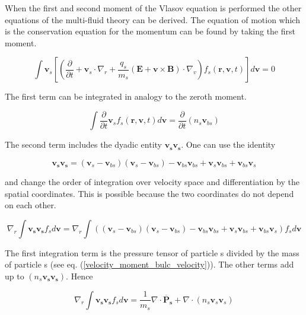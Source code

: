 \documentclass[a4paper,11pt]{thesis}
\begin{document}
When the first and second moment of the Vlasov equation is performed
the other equations of the multi-fluid theory can be derived. The equation of motion which is the
conservation equation for the momentum can be found by taking the
first moment.

\begin{equation}
\int \mathbf{v}_s \left[ \left( \frac{\partial}{\partial t} + \mathbf{v}_s \cdot
\nabla_r+\frac{q_s}{m_s}(\mathbf{E}+\mathbf{v}\times
\mathbf{B})\cdot\nabla_v \right) f_s(\mathbf{r,v},t)\right]
d\mathbf{v} =0
\end{equation}

The first term can be integrated in analogy to the zeroth moment.

\begin{equation}
 \int \frac{\partial}{\partial t}\mathbf{v}_s f_s(\mathbf{r,v},t)
d\mathbf{v} = \frac{\partial}{\partial t}( n_s\mathbf{v}_{bs})
\end{equation}

The second term includes the dyadic entity $\mathbf{v_sv_s}$. One can use the identity

\begin{equation}
 \mathbf{v_sv_s}=(\mathbf{v}_s-\mathbf{v}_{bs})(\mathbf{v}_s-\mathbf{v}_{bs})-\mathbf{v}_{bs}\mathbf{v}_{bs}+\mathbf{v}_{s}\mathbf{v}_{bs}+\mathbf{v}_{bs}\mathbf{v}_{s}
\end{equation}

and change the order of integration over velocity space and differentiation by the spatial coordinates. This is possible because the two coordinates do not depend on each other.

\begin{equation}
 \nabla_r \int  \mathbf{v_sv_s} f_s d\mathbf{v}= \nabla_r \int  ((\mathbf{v}_s-\mathbf{v}_{bs})(\mathbf{v}_s-\mathbf{v}_{bs})-\mathbf{v}_{bs}\mathbf{v}_{bs}+\mathbf{v}_{s}\mathbf{v}_{bs}+\mathbf{v}_{bs}\mathbf{v}_{s}) f_s d\mathbf{v}
\end{equation}

The first integration term is the pressure tensor of particle s divided by the mass of particle s (see eq. (\ref{velocity_moment_bulc_velocity})). The other terms add up to $(n_s \mathbf{v_sv_s})$. Hence

\begin{equation}
 \nabla_r \int  \mathbf{v_sv_s} f_s d\mathbf{v}= \frac{1}{m_s}\nabla \cdot
     \mathbf{\overline{P}_s}+\nabla \cdot
     (n_s \mathbf{v}_s  \mathbf{v}_s)
\end{equation}
\end{document}
